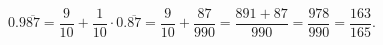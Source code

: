 $0.9\overline{87}=\dfrac9{10}+\dfrac1{10}\cdot0.\overline{87}=\dfrac9{10}+\dfrac{87}{990}=\dfrac{891+87}{990}=\dfrac{978}{990}=\boxed{\dfrac{163}{165}}$.
